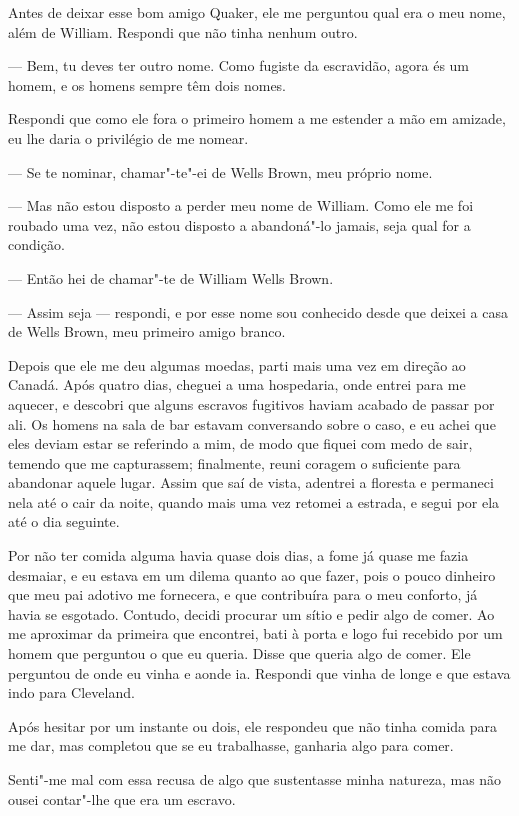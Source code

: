 Antes de deixar esse bom amigo Quaker, ele me perguntou qual era o meu
nome, além de William. Respondi que não tinha nenhum outro.

--- Bem, tu deves ter outro nome. Como fugiste da escravidão, agora és
um homem, e os homens sempre têm dois nomes.

Respondi que como ele fora o primeiro homem a me estender a mão em
amizade, eu lhe daria o privilégio de me nomear.

--- Se te nominar, chamar"-te"-ei de Wells Brown, meu próprio nome.

--- Mas não estou disposto a perder meu nome de William. Como ele me foi
roubado uma vez, não estou disposto a abandoná"-lo jamais, seja qual for
a condição.

--- Então hei de chamar"-te de William Wells Brown.

--- Assim seja --- respondi, e por esse nome sou conhecido desde que
deixei a casa de Wells Brown, meu primeiro amigo branco.

Depois que ele me deu algumas moedas, parti mais uma vez em direção ao
Canadá. Após quatro dias, cheguei a uma hospedaria, onde entrei para me
aquecer, e descobri que alguns escravos fugitivos haviam acabado de
passar por ali. Os homens na sala de bar estavam conversando sobre o
caso, e eu achei que eles deviam estar se referindo a mim, de modo que
fiquei com medo de sair, temendo que me capturassem; finalmente, reuni
coragem o suficiente para abandonar aquele lugar. Assim que saí de
vista, adentrei a floresta e permaneci nela até o cair da noite, quando
mais uma vez retomei a estrada, e segui por ela até o dia seguinte.

Por não ter comida alguma havia quase dois dias, a fome já quase me
fazia desmaiar, e eu estava em um dilema quanto ao que fazer, pois o
pouco dinheiro que meu pai adotivo me fornecera, e que contribuíra para
o meu conforto, já havia se esgotado. Contudo, decidi procurar um sítio
e pedir algo de comer. Ao me aproximar da primeira que encontrei, bati à
porta e logo fui recebido por um homem que perguntou o que eu queria.
Disse que queria algo de comer. Ele perguntou de onde eu vinha e aonde
ia. Respondi que vinha de longe e que estava indo para Cleveland.

Após hesitar por um instante ou dois, ele respondeu que não tinha comida
para me dar, mas completou que se eu trabalhasse, ganharia algo para
comer.

Senti"-me mal com essa recusa de algo que sustentasse minha natureza, mas
não ousei contar"-lhe que era um escravo.


